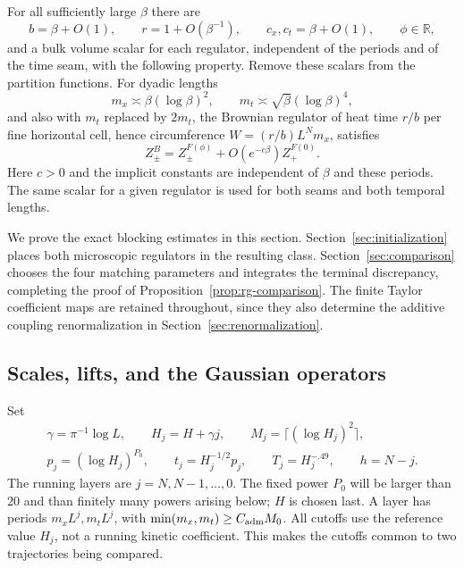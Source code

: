 \begin{proposition}\label{prop:rg-comparison}
For all sufficiently large $\beta$ there are
\[
 b=\beta+O(1),\qquad r=1+O(\beta^{-1}),\qquad
 c_x,c_t=\beta+O(1),\qquad \phi\in\mathbb R,
\]
and a bulk volume scalar for each regulator, independent of the periods
and of the time seam, with the following property.  Remove these scalars
from the partition functions.  For dyadic lengths
\[
 m_x\asymp\beta(\log\beta)^2,
 \qquad m_t\asymp\sqrt\beta(\log\beta)^4,
\]
and also with $m_t$ replaced by $2m_t$, the Brownian regulator of heat
time $r/b$ per fine horizontal cell, hence circumference
$W=(r/b)L^Nm_x$, satisfies
\begin{equation}
 Z^B_\pm=Z^{F(\phi)}_\pm+
                     O(e^{-c\beta})Z^{F(0)}_+ .
 \label{eq:R1}
\end{equation}
Here $c>0$ and the implicit constants are independent of $\beta$ and
these periods.  The same scalar for a given regulator is used for both
seams and both temporal lengths.
\end{proposition}

We prove the exact blocking estimates in this section.
Section~\ref{sec:initialization} places both microscopic regulators in
the resulting class.  Section~\ref{sec:comparison} chooses the four
matching parameters and integrates the terminal discrepancy, completing
the proof of Proposition~\ref{prop:rg-comparison}.  The finite Taylor
coefficient maps are retained throughout, since they also determine the
additive coupling renormalization in Section~\ref{sec:renormalization}.

\subsection{Scales, lifts, and the Gaussian operators}

Set
\begin{equation}
 \begin{gathered}
 \gamma=\pi^{-1}\log L,\qquad H_j=H+\gamma j,\qquad
 M_j=\lceil(\log H_j)^2\rceil,\\
 p_j=(\log H_j)^{P_0},\qquad t_j=H_j^{-1/2}p_j,
 \qquad T_j=H_j^{-.49},\qquad h=N-j.
 \end{gathered}
 \label{eq:rg-scales}
\end{equation}
The running layers are $j=N,N-1,\ldots,0$.  The fixed power $P_0$ will
be larger than $20$ and than finitely many powers arising below; $H$ is
chosen last.  A layer has periods $m_xL^j,m_tL^j$, with
$\min(m_x,m_t)\ge C_{\rm adm}M_0$.  All cutoffs use the reference value
$H_j$, not a running kinetic coefficient.  This makes the cutoffs common
to two trajectories being compared.

